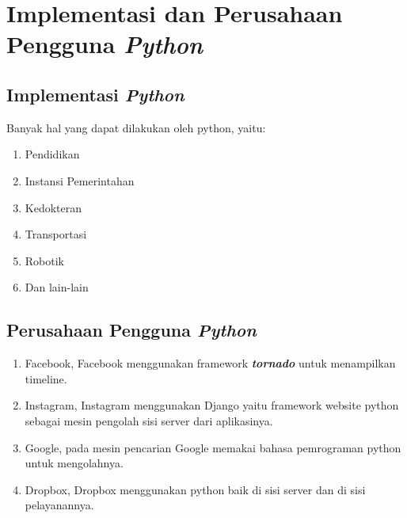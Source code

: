 \chapter{Implementasi dan Perusahaan Pengguna \textbf{\textit{Python}}}

\section{Implementasi \textbf{\textit{Python}}}
Banyak hal yang dapat dilakukan oleh python, yaitu:
\begin{enumerate}
\item Pendidikan
\item Instansi Pemerintahan
\item Kedokteran
\item Transportasi
\item Robotik
\item Dan lain-lain
\end{enumerate}

\section{Perusahaan Pengguna \textbf{\textit{Python}}}
\begin{enumerate}
\item Facebook, Facebook menggunakan framework \textbf{\textit{tornado}} untuk menampilkan timeline.
\item Instagram, Instagram menggunakan Django yaitu framework website python sebagai mesin pengolah sisi server dari aplikasinya.
\item Google, pada mesin pencarian Google memakai bahasa pemrograman python untuk mengolahnya.
\item Dropbox, Dropbox menggunakan python baik di sisi server dan di sisi pelayanannya.
\end{enumerate}